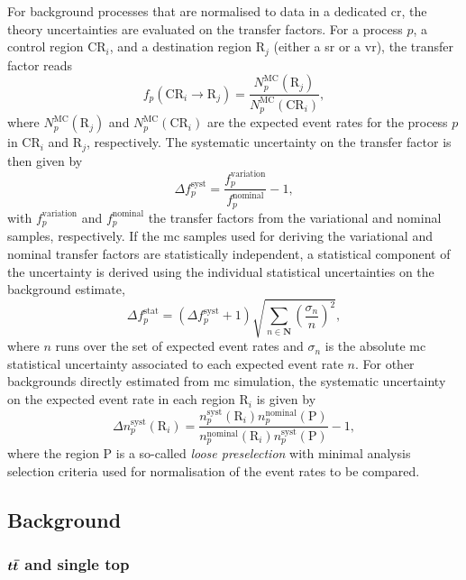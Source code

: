 For background processes that are normalised to data in a dedicated \gls{cr}, the theory uncertainties are evaluated on the transfer factors. For a process $p$, a control region CR$_i$, and a destination region R$_j$ (either a \gls{sr} or a \gls{vr}), the transfer factor reads
\begin{equation}
	f_p(\mathrm{CR}_i\rightarrow \mathrm{R}_j) = \frac{N^\mathrm{MC}_p(\mathrm{R}_j)}{N^\mathrm{MC}_p(\mathrm{CR}_i)},
\end{equation}
where $N^\mathrm{MC}_p(\mathrm{R}_j)$ and $N^\mathrm{MC}_p(\mathrm{CR}_i)$ are the expected event rates for the process $p$ in CR$_i$ and R$_j$, respectively. The systematic uncertainty on the transfer factor is then given by
\begin{equation}
	\Delta f_p^\mathrm{syst} = \frac{f_p^\mathrm{variation}}{f_p^\mathrm{nominal}} - 1,
\end{equation}
with $f_p^\mathrm{variation}$ and $f_p^\mathrm{nominal}$ the transfer factors from the variational and nominal samples, respectively. If the \gls{mc} samples used for deriving the variational and nominal transfer factors are statistically independent, a statistical component of the uncertainty is derived using the individual statistical uncertainties on the background estimate,
\begin{equation}
	\Delta f_p^\mathrm{stat} = (\Delta f_p^\mathrm{syst} + 1 ) \sqrt{\sum_{n\in\boldsymbol{N}}(\frac{\sigma_n}{n})^2},
\end{equation}
 where $n$ runs over the set of expected event rates and $\sigma_n$ is the absolute \gls{mc} statistical uncertainty associated to each expected event rate $n$. For other backgrounds directly estimated from \gls{mc} simulation, the systematic uncertainty on the expected event rate in each region R$_i$ is given by
 \begin{equation}
 	\Delta n_p^\mathrm{syst}(\mathrm{R}_i) = \frac{n_p^\mathrm{syst}(\mathrm{R}_i)n_p^\mathrm{nominal}(\mathrm{P})}{n_p^\mathrm{nominal}(\mathrm{R}_i)n_p^\mathrm{syst}(\mathrm{P})} - 1,
 \end{equation}
 where the region P is a so-called \textit{loose preselection} with minimal analysis selection criteria used for normalisation of the event rates to be compared.
 
 
 \subsection{Background}
 
 \subsubsection{$\boldsymbol{t\bar{t}}$ and single top}
 
